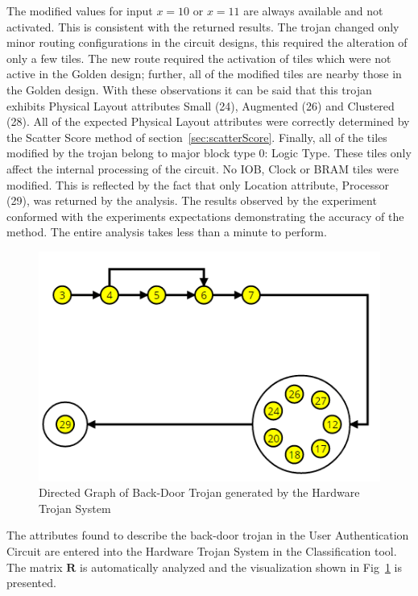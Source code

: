 \documentclass[journal, hidelinks]{IEEEtran}
\begin{document}
The modified values for input $x=10$ or $x=11$ are always available and not activated.
This is consistent with the returned results.
The trojan changed only minor routing configurations in the circuit designs, this required the alteration of only a few tiles.
The new route required the activation of tiles which were not active in the Golden design; further, all of the modified tiles are nearby those in the Golden design. 
With these observations it can be said that this trojan exhibits Physical Layout attributes Small (24), Augmented (26) and Clustered (28). 
All of the expected Physical Layout attributes were correctly determined by the Scatter Score method of section~\ref{sec:scatterScore}.
Finally, all of the tiles modified by the trojan belong to major block type 0: Logic Type.
These tiles only affect the internal processing of the circuit.
No IOB, Clock or BRAM tiles were modified.
This is reflected by the fact that only Location attribute, Processor (29), was returned by the analysis.
The results observed by the experiment conformed with the experiments expectations demonstrating the accuracy of the method.
The entire analysis takes less than a minute to perform.
\begin{figure}[h]
	\centering
	\includegraphics[width=0.91\linewidth]{Figures/backDoorVisual}
	\caption[Directed Graph of Back-Door Trojan generated by the Hardware Trojan System]{Directed Graph of Back-Door Trojan generated by the Hardware Trojan System}
	\label{fig:backDoorVisual}
\end{figure}
The attributes found to describe the back-door trojan in the User Authentication Circuit are entered into the Hardware Trojan System in the Classification tool.
The matrix $\mathbf{R}$ is automatically analyzed and the visualization shown in Fig~\ref{fig:backDoorVisual} is presented.
\end{document}
